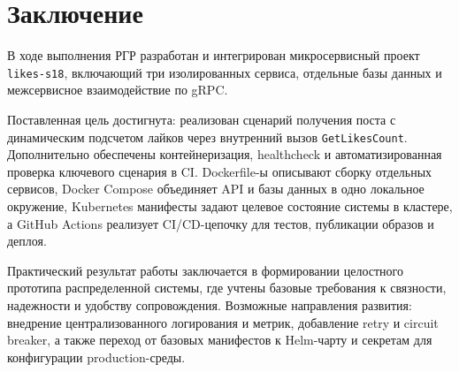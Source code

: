\chapter*{Заключение}

В ходе выполнения РГР разработан и интегрирован микросервисный проект \texttt{likes-s18},
включающий три изолированных сервиса, отдельные базы данных и межсервисное взаимодействие по gRPC.

Поставленная цель достигнута: реализован сценарий получения поста с динамическим подсчетом лайков
через внутренний вызов \texttt{GetLikesCount}. Дополнительно обеспечены контейнеризация, healthcheck
и автоматизированная проверка ключевого сценария в CI. Dockerfile-ы описывают сборку отдельных
сервисов, Docker Compose объединяет API и базы данных в одно локальное окружение, Kubernetes
манифесты задают целевое состояние системы в кластере, а GitHub Actions реализует CI/CD-цепочку
для тестов, публикации образов и деплоя.

Практический результат работы заключается в формировании целостного прототипа распределенной
системы, где учтены базовые требования к связности, надежности и удобству сопровождения.
Возможные направления развития: внедрение централизованного логирования и метрик, добавление retry
и circuit breaker, а также переход от базовых манифестов к Helm-чарту и секретам для
конфигурации production-среды.
